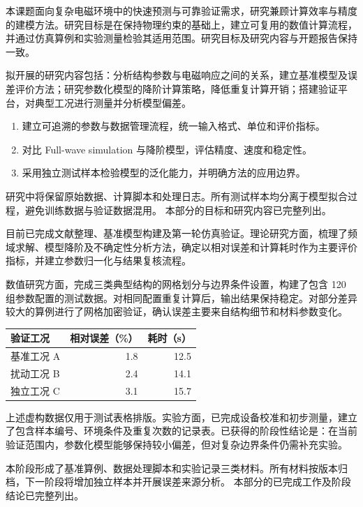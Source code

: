 \begin{xzlyj}\end{xzlyj}
\begin{yjmbnr}
本课题面向复杂电磁环境中的快速预测与可靠验证需求，研究兼顾计算效率与精度的建模方法。研究目标是在保持物理约束的基础上，建立可复用的数值计算流程，并通过仿真算例和实验测量检验其适用范围。研究目标及研究内容与开题报告保持一致。

拟开展的研究内容包括：分析结构参数与电磁响应之间的关系，建立基准模型及误差评价方法；研究参数化模型的降阶计算策略，降低重复计算开销；搭建验证平台，对典型工况进行测量并分析模型偏差。

\begin{enumerate}
  \item 建立可追溯的参数与数据管理流程，统一输入格式、单位和评价指标。
  \item 对比 Full-wave simulation 与降阶模型，评估精度、速度和稳定性。
  \item 采用独立测试样本检验模型的泛化能力，并明确方法的应用边界。
\end{enumerate}
研究中将保留原始数据、计算脚本和处理日志。所有测试样本均分离于模型拟合过程，避免训练数据与验证数据混用。
本部分的目标和研究内容已完整列出。
\end{yjmbnr}

\begin{ywcgz}
目前已完成文献整理、基准模型构建及第一轮仿真验证。理论研究方面，梳理了频域求解、模型降阶及不确定性分析方法，确定以相对误差和计算耗时作为主要评价指标，并建立参数归一化与结果复核流程。

数值研究方面，完成三类典型结构的网格划分与边界条件设置，构建了包含 120 组参数配置的测试数据。对相同配置重复计算后，输出结果保持稳定。对部分差异较大的算例进行了网格加密验证，确认误差主要来自结构细节和材料参数变化。

\begin{center}
\begin{tabular}{lrr}
\toprule
验证工况 & 相对误差（\%） & 耗时（s）\\
\midrule
基准工况 A & 1.8 & 12.5\\
扰动工况 B & 2.4 & 14.1\\
独立工况 C & 3.1 & 15.7\\
\bottomrule
\end{tabular}
\end{center}
上述虚构数据仅用于测试表格排版。实验方面，已完成设备校准和初步测量，建立了包含样本编号、环境条件及重复次数的记录表。已获得的阶段性结论是：在当前验证范围内，参数化模型能够保持较小偏差，但对复杂边界条件仍需补充实验。

本阶段形成了基准算例、数据处理脚本和实验记录三类材料。所有材料按版本归档，下一阶段将增加独立样本并开展误差来源分析。
本部分的已完成工作及阶段结论已完整列出。
\end{ywcgz}

